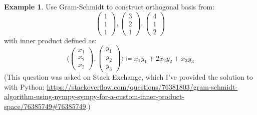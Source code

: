 \documentclass[12pt, a4paper]{article}
\newcommand{\inner}[1]{\langle #1 \rangle}
\theoremstyle{remark}
\theoremstyle{definition}
\newtheorem{example}{Example}
\numberwithin{equation}{section}
\numberwithin{definition}{section}
\numberwithin{example}{section}
\numberwithin{exercise}{section}
\numberwithin{remark}{section}
\numberwithin{figure}{section}
\begin{document}
\begin{example}
    Use Gram-Schmidt to construct orthogonal basis from:
    \begin{equation*}
        \begin{pmatrix}
            1 \\ 1 \\ 1
        \end{pmatrix},
        \begin{pmatrix}
            3 \\ 2 \\ 1
        \end{pmatrix},
        \begin{pmatrix}
            4 \\ 1 \\ 2
        \end{pmatrix}
    \end{equation*}
    with inner product defined as:
    \begin{equation*}
        \inner{
            \begin{pmatrix}
                x_1 \\ x_2 \\ x_3
            \end{pmatrix},
            \begin{pmatrix}
                y_1 \\ y_2 \\ y_3
            \end{pmatrix}
        }
        \coloneqq
        x_1 y_1 + 2 x_2 y_2 + x_3 y_3
    \end{equation*}
    (This question was asked on Stack Exchange, which I've provided the solution to with Python:
    \url{https://stackoverflow.com/questions/76381803/gram-schmidt-algorithm-using-nympy-sympy-for-a-custom-inner-product-space/76385749#76385749}.)
\end{example}
\end{document}
